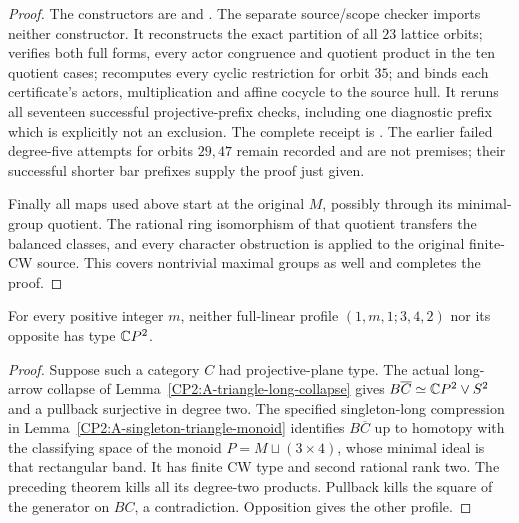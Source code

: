 \begin{proof}
The constructors are
 and
.
The separate source/scope checker
imports neither constructor. It reconstructs the exact
partition of all $23$ lattice orbits; verifies both full
forms, every actor congruence and quotient product in
the ten quotient cases; recomputes every cyclic restriction
for orbit $35$; and binds each certificate's actors,
multiplication and affine cocycle to the source hull.
It reruns all seventeen successful projective-prefix
checks, including one diagnostic prefix which is explicitly
not an exclusion. The complete receipt is
.
The earlier failed degree-five attempts for orbits $29,47$
remain recorded and are not premises; their successful
shorter bar prefixes supply the proof just given.

Finally all maps used above start at the original $M$,
possibly through its minimal-group quotient. The rational
ring isomorphism of that quotient transfers the balanced
classes, and every character obstruction is applied to
the original finite-CW source. This covers nontrivial
maximal groups as well and completes the proof.
\end{proof}

\begin{corollary}
\label{CP2:A-three-four-two-triangles}
For every positive integer $m$, neither full-linear profile
$(1,m,1;3,4,2)$ nor its opposite has type $\mathbb{C}P^2$.
\end{corollary}
\begin{proof}
Suppose such a category $C$ had projective-plane type.
The actual long-arrow collapse of
Lemma~\ref{CP2:A-triangle-long-collapse} gives
$B\overline C\simeq\mathbb{C}P^2\vee S^2$ and a pullback
surjective in degree two. The specified singleton-long
compression in Lemma~\ref{CP2:A-singleton-triangle-monoid}
identifies $B\overline C$ up to homotopy with the classifying
space of the monoid $P=M\sqcup(3\times4)$, whose minimal
ideal is that rectangular band. It has finite CW type
and second rational rank two. The preceding theorem
kills all its degree-two products. Pullback kills the
square of the generator on $BC$, a contradiction.
Opposition gives the other profile.
\end{proof}
